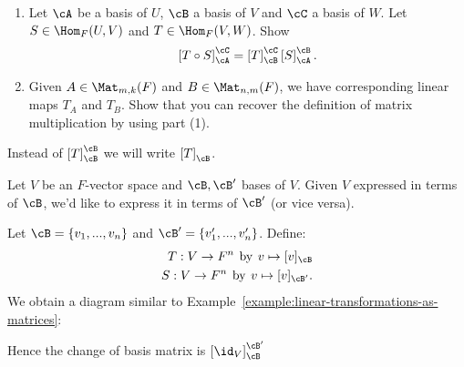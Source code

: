     \begin{exercise}
        \phantom{a}
        \begin{enumerate}[label = (\arabic*)]
            \item Let $\cA$ be a basis of $U$, $\cB$ a basis of $V$ and $\cC$ a basis of $W$. Let $S \in \Hom_F{(U,V)}$ and $T \in \Hom_F{(V,W)}$. Show
                \begin{equation*}
                \begin{split}
                    \left[ T \circ S \right]_\cA ^ \cC = \left[ T \right]_\cB ^\cC \left[ S \right]_\cA ^ \cB.
                \end{split}
                \end{equation*}
            \item Given $A \in \Mat_{m,k}(F)$ and $B \in \Mat_{n,m}(F)$, we have corresponding linear maps $T_A$ and $T_B$. Show that you can recover the definition of matrix multiplication by using part (1).
        \end{enumerate}
    \end{exercise}

    \begin{note}
        Instead of $\left[ T \right]_\cB ^ \cB$ we will write $\left[ T \right]_\cB$.
    \end{note}

    \begin{example}
        Let $V$ be an $F$-vector space and $\cB,\cB'$ bases of $V$. Given $V$ expressed in terms of $\cB$, we'd like to express it in terms of $\cB'$ (or vice versa).

        Let $\cB = \{v_1,...,v_n\}$ and $\cB' = \{v_1 ' ,...,v_n '\}$. Define:
            \begin{equation*}
            \begin{split}
                T:V \rightarrow F^n \hspace{4pt}\text{by}\hspace{4pt}v \mapsto [v]_\cB\\
                S:V \rightarrow F^n \hspace{4pt}\text{by}\hspace{4pt}v \mapsto [v]_{\cB'}.\\
            \end{split}
            \end{equation*}
        We obtain a diagram similar to Example~\ref{example:linear-transformations-as-matrices}:
            \begin{center}
            \end{center}
        Hence the change of basis matrix is $\left[ \id_V \right]_\cB^{\cB'}$
    \end{example}

